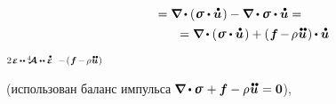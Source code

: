 \begin{otherlanguage}{russian}
\begin{equation*}
\begin{array}{c}
= \boldnabla \hspace{-0.1ex} \dotp \left( \hspace{.1ex} \linearstress \dotp \mathdotabove{\bm{u}} \hspace{.15ex} \right) -
\tikzmark{NablaDotTauDynamicsBegin} \boldnabla \dotp \linearstress \tikzmark{NablaDotTauDynamicsEnd} \dotp \mathdotabove{\bm{u}} =
\\[.4em]
%
\hspace*{4em}
= \boldnabla \hspace{-0.1ex} \dotp \left( \hspace{.1ex} \linearstress \dotp \mathdotabove{\bm{u}} \hspace{.15ex} \right)
+ ( \hspace{.12ex} \bm{f} \hspace{-0.2ex} - \hspace{-0.2ex} \rho \hspace{.1ex} \mathdotdotabove{\bm{u}} \hspace{.15ex} ) \hspace{-0.1ex} \dotp \mathdotabove{\bm{u}}
\end{array}\end{equation*}%
%
{${\scalebox{0.75}{$ 2 \hspace{.2ex} \mathboldepsilon \hspace{-0.1ex} \dotdotp \hspace{-0.1ex} \stiffnesstensor \dotdotp \mathdotabove{\mathboldepsilon} $}}$}
%
{${\scalebox{0.75}{$ - \hspace{.2ex} ( \hspace{.12ex} \bm{f} \hspace{-0.2ex} - \hspace{-0.2ex} \rho \hspace{.1ex} \mathdotdotabove{\bm{u}} \hspace{.15ex} ) $}}$}

\nopagebreak \vspace{-0.6em} \noindent
(использован баланс импульса ${\hspace{-0.24ex}\boldnabla \dotp \linearstress \hspace{.15ex} + \bm{f} - \rho \hspace{.1ex} \mathdotdotabove{\bm{u}} \hspace{.1ex} = \bm{0}}$),


\end{otherlanguage}

